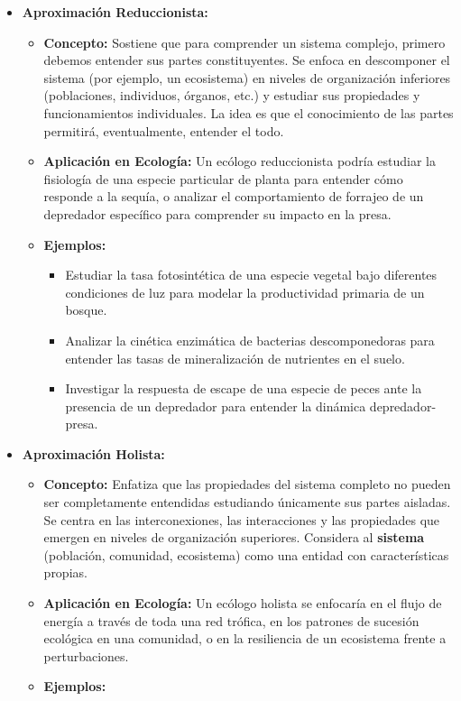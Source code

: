 \documentclass[
]{book}
\providecommand{\tightlist}{%
  \setlength{\itemsep}{0pt}\setlength{\parskip}{0pt}}
\begin{document}
\begin{itemize}
\tightlist
\item
  \textbf{Aproximación Reduccionista:}

  \begin{itemize}
  \tightlist
  \item
    \textbf{Concepto:} Sostiene que para comprender un sistema complejo, primero debemos entender sus partes constituyentes. Se enfoca en descomponer el sistema (por ejemplo, un ecosistema) en niveles de organización inferiores (poblaciones, individuos, órganos, etc.) y estudiar sus propiedades y funcionamientos individuales. La idea es que el conocimiento de las partes permitirá, eventualmente, entender el todo.
  \item
    \textbf{Aplicación en Ecología:} Un ecólogo reduccionista podría estudiar la fisiología de una especie particular de planta para entender cómo responde a la sequía, o analizar el comportamiento de forrajeo de un depredador específico para comprender su impacto en la presa.
  \item
    \textbf{Ejemplos:}

    \begin{itemize}
    \tightlist
    \item
      Estudiar la tasa fotosintética de una especie vegetal bajo diferentes condiciones de luz para modelar la productividad primaria de un bosque.
    \item
      Analizar la cinética enzimática de bacterias descomponedoras para entender las tasas de mineralización de nutrientes en el suelo.
    \item
      Investigar la respuesta de escape de una especie de peces ante la presencia de un depredador para entender la dinámica depredador-presa.
    \end{itemize}
  \end{itemize}
\item
  \textbf{Aproximación Holista:}

  \begin{itemize}
  \tightlist
  \item
    \textbf{Concepto:} Enfatiza que las propiedades del sistema completo no pueden ser completamente entendidas estudiando únicamente sus partes aisladas. Se centra en las interconexiones, las interacciones y las propiedades que emergen en niveles de organización superiores. Considera al \textbf{sistema} (población, comunidad, ecosistema) como una entidad con características propias.
  \item
    \textbf{Aplicación en Ecología:} Un ecólogo holista se enfocaría en el flujo de energía a través de toda una red trófica, en los patrones de sucesión ecológica en una comunidad, o en la resiliencia de un ecosistema frente a perturbaciones.
  \item
    \textbf{Ejemplos:}


\end{itemize}
\end{itemize}
\end{document}
